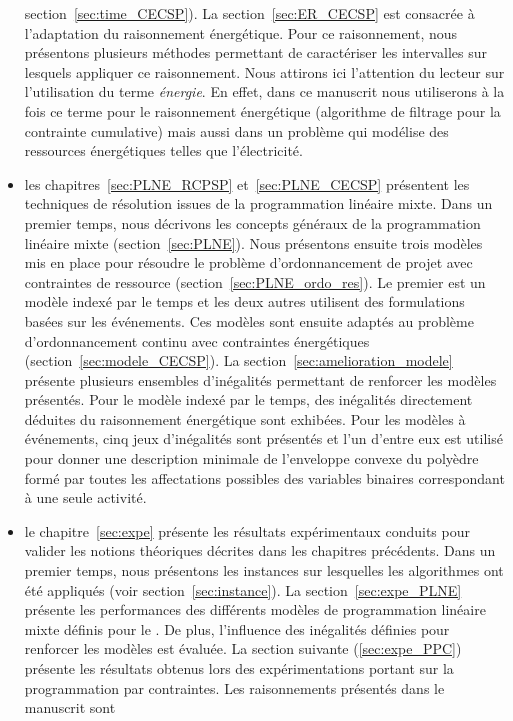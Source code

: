 \begin{itemize}
  section~\ref{sec:time_CECSP}). La section~\ref{sec:ER_CECSP} est
  consacrée à l'adaptation du raisonnement énergétique. Pour ce
  raisonnement, nous présentons plusieurs méthodes permettant de
  caractériser les intervalles sur lesquels appliquer ce
  raisonnement. Nous attirons ici l'attention du lecteur sur
  l'utilisation du terme {\it énergie}. En effet, dans ce manuscrit
  nous utiliserons à la fois ce terme pour le raisonnement
  énergétique (algorithme de filtrage pour la contrainte cumulative)
  mais aussi dans un problème qui modélise des ressources énergétiques
  telles que l'électricité.
\item les chapitres~\ref{sec:PLNE_RCPSP} et~\ref{sec:PLNE_CECSP}
  présentent les techniques de résolution issues de la programmation
  linéaire mixte. Dans un premier temps, nous décrivons les concepts généraux
  de la programmation linéaire mixte (section~\ref{sec:PLNE}). Nous
  présentons ensuite trois modèles mis en place pour
  résoudre le problème d'ordonnancement de projet avec contraintes de
  ressource (section~\ref{sec:PLNE_ordo_res}). Le premier est un
  modèle indexé par le temps et les deux autres utilisent des
  formulations basées sur les événements. Ces modèles sont
  ensuite adaptés au problème d'ordonnancement continu
avec contraintes énergétiques (section~\ref{sec:modele_CECSP}). La 
section~\ref{sec:amelioration_modele} présente plusieurs
ensembles d'inégalités permettant de renforcer les modèles
présentés. Pour le modèle indexé par le temps, des inégalités
directement déduites du raisonnement énergétique sont exhibées. Pour
les modèles à événements, cinq jeux d'inégalités sont présentés et
l'un d'entre eux est utilisé pour donner une description minimale de
l'enveloppe convexe du polyèdre formé par toutes les affectations
possibles des variables binaires correspondant à une seule activité.
\item le chapitre~\ref{sec:expe} présente les résultats expérimentaux
  conduits pour valider les notions théoriques décrites dans les
  chapitres précédents. Dans un premier temps, nous présentons les
  instances sur lesquelles les algorithmes ont été appliqués (voir
  section~\ref{sec:instance}). La section~\ref{sec:expe_PLNE}
  présente les performances des différents modèles de programmation
  linéaire mixte définis pour le \CECSP. De plus, l'influence des 
  inégalités définies pour renforcer les modèles est évaluée. La
  section suivante (\ref{sec:expe_PPC}) présente les résultats obtenus
  lors des expérimentations portant sur la programmation par
  contraintes. Les raisonnements présentés dans le manuscrit sont

\end{itemize}
